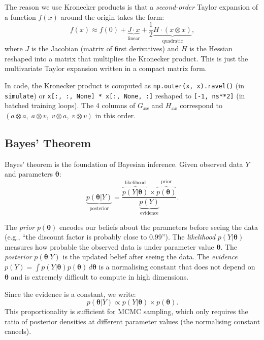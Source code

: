 \documentclass[11pt,a4paper]{article}
\theoremstyle{definition}
\newcommand{\btheta}{\boldsymbol{\theta}}
\newcommand{\code}[1]{\texttt{\color{codecolor}#1}}
\begin{document}
	The reason we use Kronecker products is that a \emph{second-order} Taylor expansion of a function $f(x)$ around the origin takes the form:
	\begin{equation}
		f(x) \approx f(0) + \underbrace{J \cdot x}_{\text{linear}} + \frac{1}{2} \underbrace{H \cdot (x \otimes x)}_{\text{quadratic}},
	\end{equation}
	where $J$ is the Jacobian (matrix of first derivatives) and $H$ is the Hessian reshaped into a matrix that multiplies the Kronecker product.
	This is just the multivariate Taylor expansion written in a compact matrix form.
	
	In code, the Kronecker product is computed as \code{np.outer(x, x).ravel()} (in \code{simulate}) or \code{x[:, :, None] * x[:, None, :]} reshaped to \code{[-1, ns**2]} (in batched training loops).
	The 4 columns of $G_{xx}$ and $H_{xx}$ correspond to $(a \otimes a, \; a \otimes v, \; v \otimes a, \; v \otimes v)$ in this order.
	
	\subsection{Bayes' Theorem}
	\label{sec:bayes_prelim}
	
	Bayes' theorem is the foundation of Bayesian inference.
	Given observed data $Y$ and parameters $\btheta$:
	\begin{equation}\label{eq:bayes}
		\underbrace{p(\btheta | Y)}_{\text{posterior}} = \frac{\overbrace{p(Y | \btheta)}^{\text{likelihood}} \times \overbrace{p(\btheta)}^{\text{prior}}}{\underbrace{p(Y)}_{\text{evidence}}}.
	\end{equation}
	
	The \emph{prior} $p(\btheta)$ encodes our beliefs about the parameters before seeing the data (e.g., ``the discount factor is probably close to 0.99'').
	The \emph{likelihood} $p(Y|\btheta)$ measures how probable the observed data is under parameter value $\btheta$.
	The \emph{posterior} $p(\btheta|Y)$ is the updated belief after seeing the data.
	The \emph{evidence} $p(Y) = \int p(Y|\btheta)p(\btheta)\,d\btheta$ is a normalising constant that does not depend on $\btheta$ and is extremely difficult to compute in high dimensions.
	
	Since the evidence is a constant, we write:
	\begin{equation}\label{eq:bayes_prop}
		p(\btheta | Y) \propto p(Y | \btheta) \times p(\btheta).
	\end{equation}
	This proportionality is sufficient for MCMC sampling, which only requires the ratio of posterior densities at different parameter values (the normalising constant cancels).
	
\end{document}
